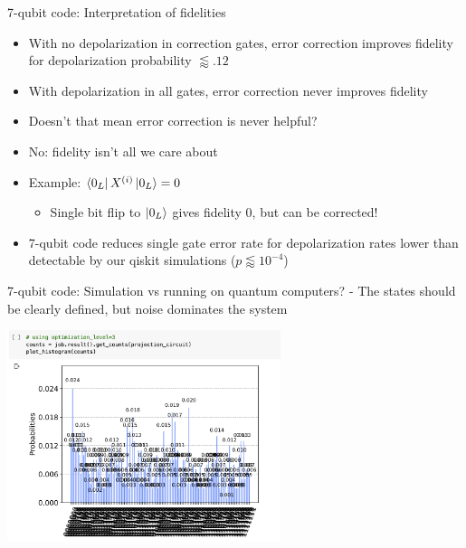 \documentclass{beamer}
\begin{document}
\begin{frame}{7-qubit code: Interpretation of fidelities}
  \begin{itemize}
  \item With no depolarization in correction gates, error correction improves fidelity for depolarization probability $\lessapprox .12$
  \item With depolarization in all gates, error correction never improves fidelity
    \pause
  \item Doesn't that mean error correction is never helpful?
    \pause
  \item No: fidelity isn't all we care about
  \item Example: $\left\langle{0_L}\right\vert X^{(i)}\left\vert{0_L}\right\rangle=0$
    \begin{itemize}
    \item Single bit flip to $\left\vert{0_L}\right\rangle$ gives fidelity $0$, but can be corrected!
    \end{itemize}
    \pause
  \item 7-qubit code reduces single gate error rate for depolarization rates lower than detectable by our qiskit simulations ($p\lessapprox 10^{-4}$)
  \end{itemize}
\end{frame}
  
\begin{frame}{7-qubit code: Simulation vs running on quantum computers?}
    - The states should be clearly defined, but noise dominates the system
    \begin{center}
        \includegraphics[width=8cm]{7-melbourne-fidelity}
    \end{center}
\end{frame}
\end{document}
